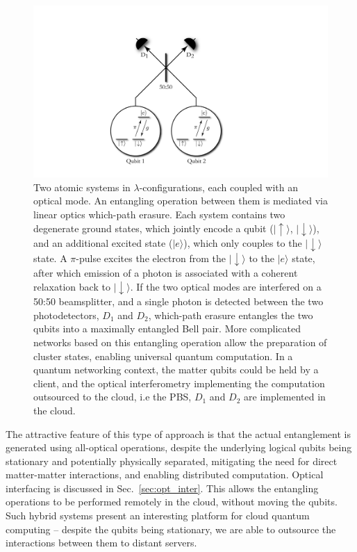 \documentclass[aps,rmp,twocolumn,amsmath,amssymb,nofootinbib,superscriptaddress]{revtex4}
\newcommand{\ket}[1]{|#1\rangle}
\begin{document}
\begin{figure}[!htb]
\includegraphics[width=0.75\columnwidth]{barrett_kok}
\caption{Two atomic systems in $\lambda$-configurations, each coupled with an optical mode. An entangling operation between them is mediated via linear optics which-path erasure. Each system contains two degenerate ground states, which jointly encode a qubit ($\ket{\!\uparrow}$, $\ket{\!\downarrow}$), and an additional excited state ($\ket{e}$), which only couples to the $\ket{\!\downarrow}$ state. A $\pi$-pulse excites the electron from the $\ket{\!\downarrow}$ to the $\ket{e}$ state, after which emission of a photon is associated with a coherent relaxation back to $\ket{\!\downarrow}$. If the two optical modes are interfered on a 50:50 beamsplitter, and a single photon is detected between the two photodetectors, $D_1$ and $D_2$, which-path erasure entangles the two qubits into a maximally entangled Bell pair. More complicated networks based on this entangling operation allow the preparation of cluster states, enabling universal quantum computation. In a quantum networking context, the matter qubits could be held by a client, and the optical interferometry implementing the computation outsourced to the cloud, i.e the PBS, $D_1$ and $D_2$ are implemented in the cloud.} \label{fig:barrett_kok}
\end{figure}

The attractive feature of this type of approach is that the actual entanglement is generated using all-optical operations, despite the underlying logical qubits being stationary and potentially physically separated, mitigating the need for direct matter-matter interactions, and enabling distributed computation. Optical interfacing is discussed in Sec.~\ref{sec:opt_inter}. This allows the entangling operations to be performed remotely in the cloud, without moving the qubits. Such hybrid systems present an interesting platform for cloud quantum computing -- despite the qubits being stationary, we are able to outsource the interactions between them to distant servers.
\end{document}
